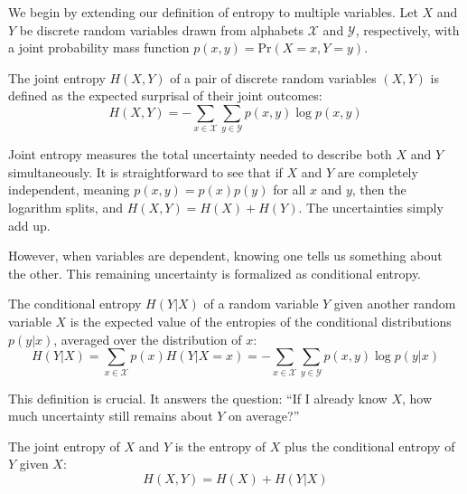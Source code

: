 We begin by extending our definition of entropy to multiple variables. Let $X$ and $Y$ be discrete random variables drawn from alphabets $\mathcal{X}$ and $\mathcal{Y}$, respectively, with a joint probability mass function $p(x, y) = \text{Pr}(X=x, Y=y)$.

\begin{definition}
The joint entropy $H(X, Y)$ of a pair of discrete random variables $(X, Y)$ is defined as the expected surprisal of their joint outcomes:
\begin{equation}
    H(X, Y) = -\sum_{x \in \mathcal{X}} \sum_{y \in \mathcal{Y}} p(x, y) \log p(x, y)
\end{equation}
\end{definition}

Joint entropy measures the total uncertainty needed to describe both $X$ and $Y$ simultaneously. It is straightforward to see that if $X$ and $Y$ are completely independent, meaning $p(x, y) = p(x)p(y)$ for all $x$ and $y$, then the logarithm splits, and $H(X, Y) = H(X) + H(Y)$. The uncertainties simply add up.

However, when variables are dependent, knowing one tells us something about the other. This remaining uncertainty is formalized as conditional entropy.

\begin{definition}
The conditional entropy $H(Y|X)$ of a random variable $Y$ given another random variable $X$ is the expected value of the entropies of the conditional distributions $p(y|x)$, averaged over the distribution of $x$:
\begin{equation}
    H(Y|X) = \sum_{x \in \mathcal{X}} p(x) H(Y | X=x) = -\sum_{x \in \mathcal{X}} \sum_{y \in \mathcal{Y}} p(x, y) \log p(y|x)
\end{equation}
\end{definition}

This definition is crucial. It answers the question: ``If I already know $X$, how much uncertainty still remains about $Y$ on average?'' 

\begin{theorem}
\label{thm:chain_rule}
The joint entropy of $X$ and $Y$ is the entropy of $X$ plus the conditional entropy of $Y$ given $X$:
\begin{equation}
    H(X, Y) = H(X) + H(Y|X)
\end{equation}
\end{theorem}

